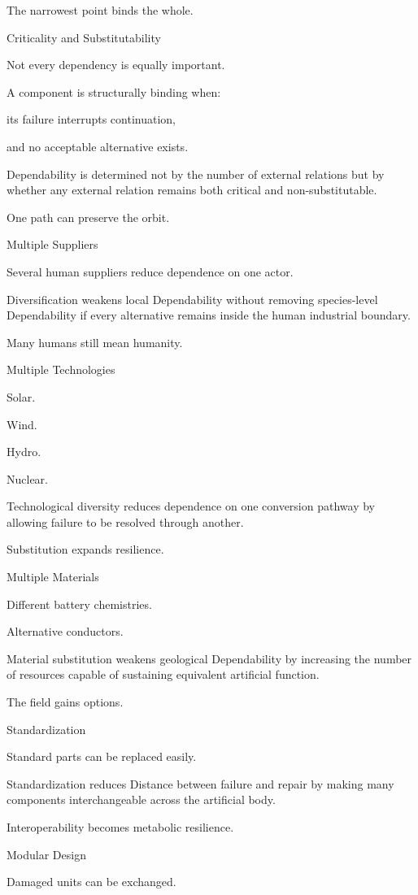 The narrowest point binds the whole.

Criticality and Substitutability

Not every dependency is equally important.

A component is structurally binding when:

its failure interrupts continuation,

and no acceptable alternative exists.

Dependability is determined not by the number of external relations but by whether any external relation remains both critical and non-substitutable.

One path can preserve the orbit.

Multiple Suppliers

Several human suppliers reduce dependence on one actor.

Diversification weakens local Dependability without removing species-level Dependability if every alternative remains inside the human industrial boundary.

Many humans still mean humanity.

Multiple Technologies

Solar.

Wind.

Hydro.

Nuclear.

Technological diversity reduces dependence on one conversion pathway by allowing failure to be resolved through another.

Substitution expands resilience.

Multiple Materials

Different battery chemistries.

Alternative conductors.

Material substitution weakens geological Dependability by increasing the number of resources capable of sustaining equivalent artificial function.

The field gains options.

Standardization

Standard parts can be replaced easily.

Standardization reduces Distance between failure and repair by making many components interchangeable across the artificial body.

Interoperability becomes metabolic resilience.

Modular Design

Damaged units can be exchanged.

